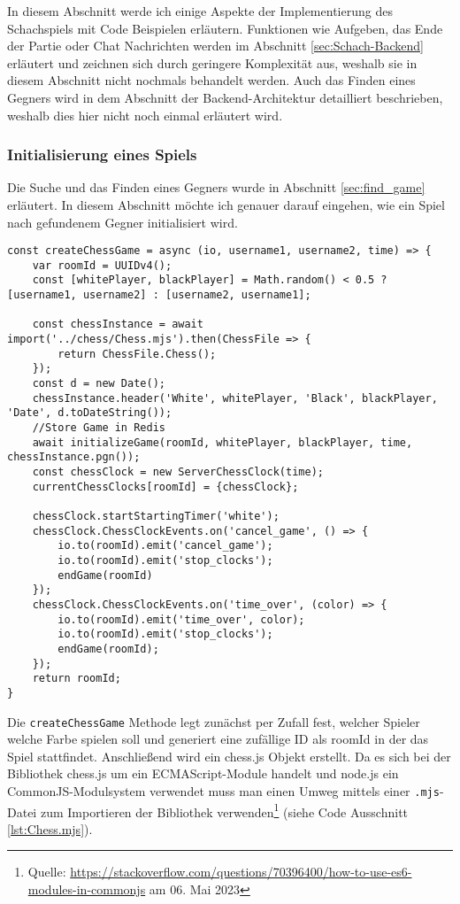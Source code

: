 In diesem Abschnitt werde ich einige Aspekte der Implementierung des Schachspiels mit Code Beispielen erläutern. Funktionen wie Aufgeben, das Ende der Partie oder Chat Nachrichten werden im Abschnitt \ref{sec:Schach-Backend} erläutert und zeichnen sich durch geringere Komplexität aus, weshalb sie in diesem Abschnitt nicht nochmals behandelt werden. Auch das Finden eines Gegners wird in dem Abschnitt der Backend-Architektur detailliert beschrieben, weshalb dies hier nicht noch einmal erläutert wird.

\subsubsection{Initialisierung eines Spiels}
Die Suche und das Finden eines Gegners wurde in Abschnitt \ref{sec:find_game} erläutert. In diesem Abschnitt möchte ich genauer darauf eingehen, wie ein Spiel nach gefundenem Gegner initialisiert wird.

\begin{lstlisting}[style=codeStyle, caption={Die createChessGame Methode zum Initialisieren einer Schachpartie}, label={lst:createChessGame}]
const createChessGame = async (io, username1, username2, time) => {
    var roomId = UUIDv4();
    const [whitePlayer, blackPlayer] = Math.random() < 0.5 ? [username1, username2] : [username2, username1];

    const chessInstance = await import('../chess/Chess.mjs').then(ChessFile => {
        return ChessFile.Chess();
    });
    const d = new Date();
    chessInstance.header('White', whitePlayer, 'Black', blackPlayer, 'Date', d.toDateString());
    //Store Game in Redis
    await initializeGame(roomId, whitePlayer, blackPlayer, time, chessInstance.pgn());
    const chessClock = new ServerChessClock(time);
    currentChessClocks[roomId] = {chessClock};

    chessClock.startStartingTimer('white');
    chessClock.ChessClockEvents.on('cancel_game', () => {
        io.to(roomId).emit('cancel_game');
        io.to(roomId).emit('stop_clocks');
        endGame(roomId)
    });
    chessClock.ChessClockEvents.on('time_over', (color) => {
        io.to(roomId).emit('time_over', color);
        io.to(roomId).emit('stop_clocks');
        endGame(roomId);
    });
    return roomId;
}
\end{lstlisting}

Die \verb|createChessGame| Methode legt zunächst per Zufall fest, welcher Spieler welche Farbe spielen soll und generiert eine zufällige ID als roomId in der das Spiel stattfindet. Anschließend wird ein chess.js Objekt erstellt. Da es sich bei der Bibliothek chess.js um ein ECMAScript-Module handelt und node.js ein CommonJS-Modulsystem verwendet muss man einen Umweg mittels einer \verb|.mjs|-Datei zum Importieren der Bibliothek verwenden\footnote{Quelle: \url{https://stackoverflow.com/questions/70396400/how-to-use-es6-modules-in-commonjs} am 06. Mai 2023} (siehe Code Ausschnitt \ref{lst:Chess.mjs}).

